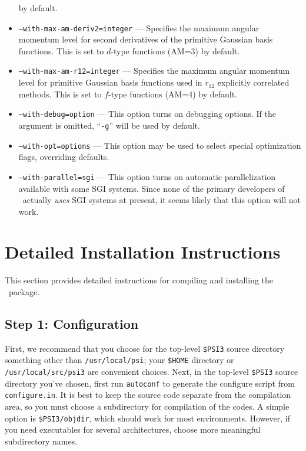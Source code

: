 \documentclass[12pt]{article}
\begin{document}
\begin{itemize}
  by default.
\item {\tt --with-max-am-deriv2=integer} --- Specifies the maximum
  angular momentum level for second derivatives of the primitive
  Gaussian basis functions.  This is set to $d$-type functions (AM=3)
  by default.
\item {\tt --with-max-am-r12=integer} --- Specifies the maximum
  angular momentum level for primitive Gaussian basis functions used
  in $r_{12}$ explicitly correlated methods.  This is set to $f$-type
  functions (AM=4) by default.
\item {\tt --with-debug=option} --- This option turns on debugging
  options.  If the argument is omitted, ``{\tt -g}'' will be used by default.
\item {\tt --with-opt=options} --- This option may be used to select
  special optimization flags, overriding defaults.
\item {\tt --with-parallel=sgi} --- This option turns on automatic
  parallelization available with some SGI systems.  Since none of the
  primary developers of \PSIthree\ actually {\em uses} SGI systems at
  present, it seems likely that this option will not work.
\end{itemize}

\section{Detailed Installation Instructions}

This section provides detailed instructions for compiling and
installing the \PSIthree\ package.  

\subsection{Step 1: Configuration}

First, we recommend that you choose for the top-level {\tt \$PSI3} source
directory something other than {\tt /usr/local/psi}; your {\tt \$HOME}
directory or {\tt /usr/local/src/psi3} are convenient choices.  Next,
in the top-level {\tt \$PSI3} source directory you've chosen, first run
{\tt autoconf} to generate the configure script from {\tt configure.in}.
It is best to keep the source code separate from the compilation area,
so you must choose a subdirectory for compilation of the codes.  A simple
option is {\tt \$PSI3/objdir}, which should work for most environments.
However, if you need executables for several architectures, choose more
meaningful subdirectory names.
\end{document}
